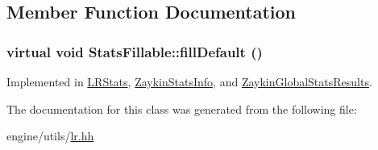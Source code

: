 \subsection{Member Function Documentation}
\hypertarget{classStatsFillable_a6bc1a66ea949a078faa1b9ccdac54aba}{
\subsubsection[{fillDefault}]{\setlength{\rightskip}{0pt plus 5cm}virtual void StatsFillable::fillDefault ()}}
\label{classStatsFillable_a6bc1a66ea949a078faa1b9ccdac54aba}


Implemented in \hyperlink{classLRStats_a42f08be70d011bef6da77f20ffc999fe}{LRStats}, \hyperlink{classZaykinStatsInfo_ac10ab8cf255d518161ce459ebcfdc8a4}{ZaykinStatsInfo}, and \hyperlink{classZaykinGlobalStatsResults_a6b45b4b6ad25c29a63363651345f0dbe}{ZaykinGlobalStatsResults}.



The documentation for this class was generated from the following file:\begin{DoxyCompactItemize}
\item 
engine/utils/\hyperlink{lr_8hh}{lr.hh}\end{DoxyCompactItemize}
